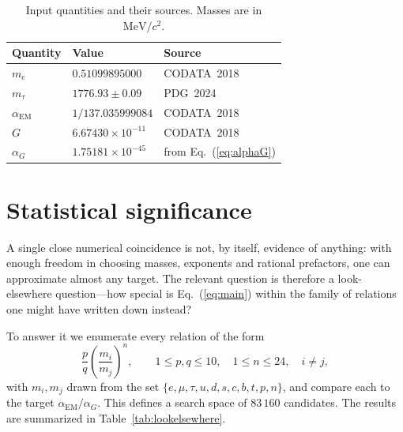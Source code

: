 \documentclass[aps,prd,preprint,amsmath,amssymb,nofootinbib]{revtex4-2}
\begin{document}
\begin{table}[t]
\caption{Input quantities and their sources. Masses are in
$\mathrm{MeV}/c^2$.}
\label{tab:inputs}
\begin{ruledtabular}
\begin{tabular}{lll}
Quantity & Value & Source \\
\hline
$m_e$ & $0.51099895000$ & CODATA~2018~\cite{codata2018} \\
$m_\tau$ & $1776.93\pm 0.09$ & PDG~2024~\cite{pdg2024} \\
$\alpha_{\mathrm{EM}}$ & $1/137.035999084$ & CODATA~2018~\cite{codata2018} \\
$G$ & $6.67430\times 10^{-11}$ & CODATA~2018~\cite{codata2018} \\
$\alpha_G$ & $1.75181\times 10^{-45}$ & from Eq.~(\ref{eq:alphaG}) \\
\end{tabular}
\end{ruledtabular}
\end{table}

\section{Statistical significance}
\label{sec:lookelsewhere}

A single close numerical coincidence is not, by itself, evidence of anything:
with enough freedom in choosing masses, exponents and rational prefactors, one
can approximate almost any target. The relevant question is therefore a
look-elsewhere question---how special is Eq.~(\ref{eq:main}) within the family
of relations one might have written down instead?

To answer it we enumerate every relation of the form
\begin{equation}
\frac{p}{q}\left(\frac{m_i}{m_j}\right)^{\!n},
\qquad
1\le p,q \le 10,\quad
1\le n \le 24,\quad
i\neq j,
\label{eq:family}
\end{equation}
with $m_i,m_j$ drawn from the set
$\{e,\mu,\tau,u,d,s,c,b,t,p,n\}$, and compare each to the target
$\alpha_{\mathrm{EM}}/\alpha_G$. This defines a search space of $83\,160$
candidates. The results are summarized in Table~\ref{tab:lookelsewhere}.
\end{document}
